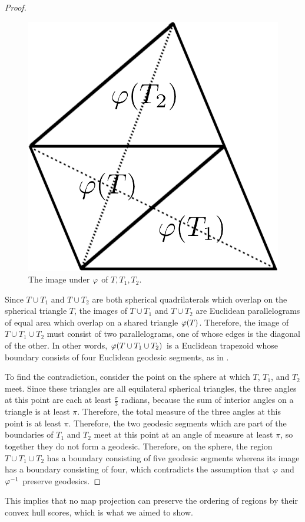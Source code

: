 \begin{proof}
		
\begin{figure}[h]
	\centering
	\includegraphics[width=.25\textwidth]{figs/spheretri_plane.png}
	\caption{The image under $\varphi$ of $T,T_1,T_2$.}
	\label{fig:sphtris_pl}
\end{figure}

Since $T\cup T_1$ and $T\cup T_2$ are both spherical quadrilaterals which overlap on the spherical triangle $T$, the images of $T\cup T_1$ and $T\cup T_2$ are Euclidean parallelograms of equal area which overlap on a shared triangle $\varphi(T)$.
	Therefore, the image of $T\cup T_1\cup T_2$ must 
	consist of two parallelograms, one of whose 
	edges is the diagonal of the other. In other words, 
	$\varphi(T\cup T_1\cup T_2)$ is a Euclidean trapezoid 
	whose boundary consists of four Euclidean geodesic 
	segments, as in .
	
	To find the contradiction, consider the point on the sphere at which $T$, $T_1$, and $T_2$ meet.  Since these triangles are all equilateral spherical triangles, the three angles at this point are each at least $\tfrac{\pi}{3}$ radians, because the sum of interior angles on a triangle is at least $\pi$.  Therefore, the total measure of the three angles at this point is at least $\pi$.  Therefore, the two geodesic segments which are part of the boundaries of $T_1$ and $T_2$ meet at this point at an angle of measure at least $\pi$, so together they do not form a geodesic.  Therefore, on the sphere, the region $T\cup T_1\cup T_2$ has a boundary consisting of five geodesic segments whereas its image has a boundary consisting of four, which contradicts the assumption that $\varphi$ and $\varphi^{-1}$ preserve geodesics.
\end{proof}

This implies that no map projection can preserve the ordering of regions by their convex hull scores, which is what we aimed to show.
